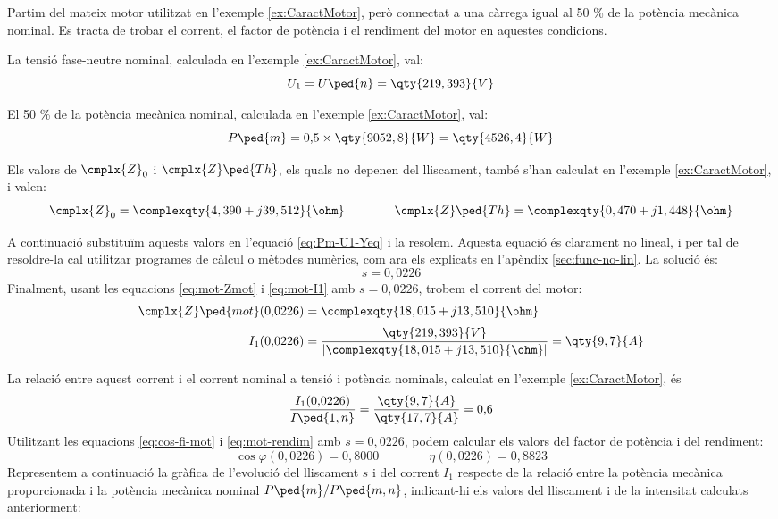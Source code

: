 \begin{exemple}\label{ex:MotCarregaReduida}
	\addcontentsxms{\MotCarregaReduida}
	Partim del mateix motor utilitzat en l'exemple \vref{ex:CaractMotor}, però connectat a una càrrega igual  al 50 \% de la potència mecànica nominal. Es tracta de trobar el corrent, el factor de potència i el rendiment del motor en aquestes condicions.

	La tensió  fase-neutre  nominal, calculada  en l'exemple \ref{ex:CaractMotor}, val: 
	\[
		U_1 = U\ped{n} = \qty{219,393}{V}
	\]
	
	El 50 \% de la potència mecànica nominal, calculada  en l'exemple \ref{ex:CaractMotor}, val:
	\[
		P\ped{m} =  0{,}5\times\qty{9052,8}{W} = \qty{4526,4}{W}
	\]

	Els valors de $\cmplx{Z}_0$ i  $\cmplx{Z}\ped{Th}$, els quals no depenen del lliscament, també s'han calculat en  l'exemple \ref{ex:CaractMotor}, i valen:
	\[
       \cmplx{Z}_0 =  \complexqty{4,390+j39,512}{\ohm} 
       \qquad \qquad
       \cmplx{Z}\ped{Th} = \complexqty{0,470+j1,448}{\ohm} 
	\]
	
	A continuació  substituïm aquests valors en l'equació \eqref{eq:Pm-U1-Yeq} i la resolem.  Aquesta equació és clarament no lineal, i per tal de resoldre-la cal utilitzar programes de càlcul o mètodes numèrics, com ara els explicats en l'apèndix \ref{sec:func-no-lin}. La solució és:
	\[
		s = 0{,}0226
	\]
	Finalment, usant les equacions \eqref{eq:mot-Zmot} i \eqref{eq:mot-I1} amb $s  = 0{,}0226$,  trobem el corrent del motor:
	\begin{align*}
	\cmplx{Z}\ped{mot}(0{,}0226) &=  \complexqty{18,015+j13,510}{\ohm} \\[0.5ex]
	I_1(0{,}0226) &= \frac{\qty{219,393}{V}}{|\complexqty{18,015+j13,510}{\ohm}|} = \qty{9,7}{A}
	\end{align*}
	
	La relació entre aquest  corrent i el corrent nominal a tensió i potència nominals, calculat en l'exemple \ref{ex:CaractMotor}, és
	\[
	\frac{I_1(0{,}0226)}{I\ped{1,n}} = \frac{\qty{9,7}{A}}{\qty{17,7}{A}} = 0{,}6
	\]
	Utilitzant les equacions  \eqref{eq:cos-fi-mot} i \eqref{eq:mot-rendim} amb $s  = 0{,}0226$, podem calcular els valors del factor de potència i del rendiment:
	\[
		\cos\varphi(0{,}0226) =  0{,}8000 \qquad \qquad
		\eta(0{,}0226) =  0{,}8823
	\]
	Representem a continuació la gràfica de l'evolució del lliscament $s$ i del corrent $I_1$ respecte de la relació entre la potència mecànica proporcionada i la potència mecànica nominal $P\ped{m}/P\ped{m,n}$, indicant-hi els valors del lliscament i de la intensitat calculats anteriorment:
	\begin{center}
		
	\end{center}


\end{exemple}
